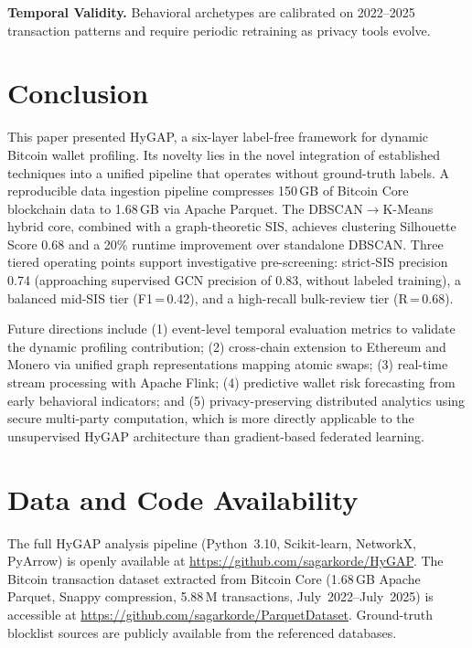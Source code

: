 \documentclass[conference]{IEEEtran}
\begin{document}
\textbf{Temporal Validity.}
Behavioral archetypes are calibrated on 2022--2025 transaction
patterns and require periodic retraining as privacy tools evolve.

\section{Conclusion}

This paper presented HyGAP, a six-layer label-free framework
for dynamic Bitcoin wallet profiling. Its novelty lies in the
novel integration of established techniques into a unified
pipeline that operates without ground-truth labels. A
reproducible data ingestion pipeline compresses 150\,GB of
Bitcoin Core blockchain data to 1.68\,GB via Apache Parquet.
The DBSCAN$\rightarrow$K-Means hybrid core, combined with a
graph-theoretic SIS, achieves clustering Silhouette Score 0.68
and a 20\% runtime improvement over standalone DBSCAN. Three
tiered operating points support investigative pre-screening:
strict-SIS precision 0.74 (approaching supervised GCN precision
of 0.83, without labeled training), a balanced mid-SIS tier
(F1\,=\,0.42), and a high-recall bulk-review tier (R\,=\,0.68).

Future directions include (1) event-level temporal evaluation
metrics to validate the dynamic profiling contribution; (2)
cross-chain extension to Ethereum and Monero via unified graph
representations mapping atomic swaps; (3) real-time stream
processing with Apache Flink; (4) predictive wallet risk
forecasting from early behavioral indicators; and (5)
privacy-preserving distributed analytics using secure multi-party
computation, which is more directly applicable to the unsupervised
HyGAP architecture than gradient-based federated learning.

\section*{Data and Code Availability}
The full HyGAP analysis pipeline (Python~3.10, Scikit-learn,
NetworkX, PyArrow) is openly available at
\url{https://github.com/sagarkorde/HyGAP}.
The Bitcoin transaction dataset extracted from Bitcoin Core
(1.68\,GB Apache Parquet, Snappy compression, 5.88\,M
transactions, July~2022--July~2025) is accessible at
\url{https://github.com/sagarkorde/ParquetDataset}.
Ground-truth blocklist sources are publicly available from the
referenced databases.
\end{document}

